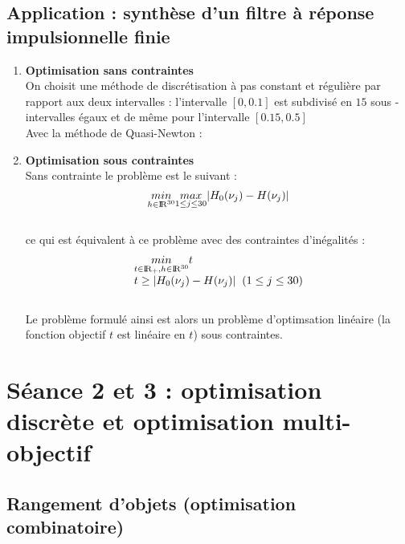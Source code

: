 \documentclass[a4paper]{article}
\begin{document}
\newpage
\subsection{Application : synthèse d'un filtre à réponse impulsionnelle finie}

\begin{enumerate}
\item \textbf{Optimisation sans contraintes}
\vspace{0.1cm}
\\ On choisit une méthode de discrétisation à pas constant et régulière par rapport aux deux intervalles : l'intervalle $[0,0.1]$ est subdivisé en $15$ sous -intervalles égaux et de même pour l'intervalle $[0.15,0.5]$
\vspace{0.1cm}
\\ Avec la méthode de Quasi-Newton : 
\item \textbf{Optimisation sous contraintes}
\vspace{0.1cm}
\\ Sans contrainte le problème est le suivant : 
\[ \underset{h \in {\rm I\!R}^{30}}{min} \underset{1 \le j \le 30}{max} |H_0(\nu_j) - H(\nu_j)|  \]
\\ ce qui est équivalent à ce problème avec des contraintes d'inégalités :
$$\begin{array}{ll}
        \underset{t \in {\rm I\!R}_+, h \in {\rm I\!R}^{30}}{min} t \\
        t \ge |H_0(\nu_j) - H(\nu_j)|  \; \; (1 \le j \le 30)
\end{array}$$
\\ Le problème formulé ainsi est alors un problème d'optimsation linéaire (la fonction objectif $t$ est linéaire en $t$) sous contraintes.

\end{enumerate}
\newpage
\section{Séance 2 et 3 : optimisation discrète et optimisation multi-objectif}

\subsection{Rangement d'objets (optimisation combinatoire)}
\end{document}
